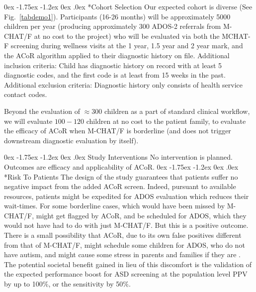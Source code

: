 \documentclass[onecolumn, compsoc,11pt]{IEEEtran}
\makeatletter
\renewcommand\subsection{\@startsection {subsection}{2}{\z@}%
                                   {0ex \@plus -1.75ex \@minus -1.2ex}%
                                   {0ex \@plus.0ex}%
                                   {\fontsize{11}{11}\selectfont\bfseries\sffamily\color{black}}}
\def\ZERO{ACoR\xspace}
\def\acor{ACoR\xspace}
\makeatother
\begin{document}
\subsection*{Cohort Selection}
Our expected cohort is diverse (See Fig.~\ref{tabdemo1}).
Participants (16-26 months) will be approximately 5000 children per year (producing approximately 300 ADOS-2 referrals from M-CHAT/F at no cost to the project) who will be evaluated via both the MCHAT-F screening  during wellness visits at the 1 year, 1.5 year and 2 year mark, and the \ZERO algorithm applied to their diagnostic history on file. Additional inclusion criteria: Child has diagnostic history on record with at least 5 diagnostic codes, and the first code is at least from 15 weeks in the past. Additional exclusion criteria: Diagnostic history only consists of health service contact codes.

Beyond the evaluation of $\approx 300$ children as a part of standard clinical workflow, we will evaluate $100-120$ children at no cost to the patient family, to evaluate the efficacy of \acor when M-CHAT/F is borderline (and does not trigger downstream diagnostic evaluation by itself).

\subsection{Study Interventions}
No intervention is planned. Outcomes are  efficacy and applicability of \ZERO.
\subsection*{Risk To Patients} The design of the study guarantees that patients suffer no negative impact from the added \ZERO screen. Indeed, pursuant to available resources, patients might  be expedited for ADOS evaluation which  reduces their wait-times. For some borderline cases, which would have been missed by M-CHAT/F, might get flagged by \ZERO, and be scheduled for ADOS, which they would not have had to do with just M-CHAT/F. But this is a positive outcome. There is a small possibility  that \ZERO, due to its own false positives  different from that of M-CHAT/F, might schedule some children for ADOS, who do not have autism, and might cause some stress in parents and families if they are . The potential societal benefit gained in lieu of this discomfort is the validation of the expected  performance boost for ASD screening at the population level PPV by up to 100\%, or the sensitivity by 50\%.
\end{document}
